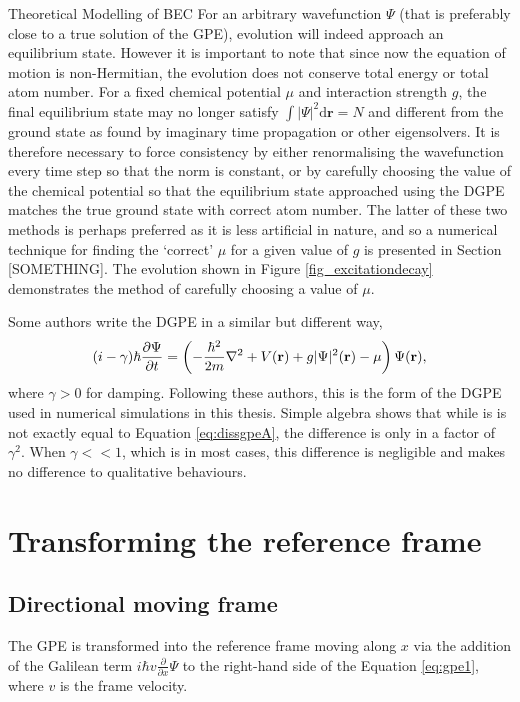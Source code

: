 \begin{chapter}{\label{cha:theoretical_model}Theoretical Modelling of BEC}
	For an arbitrary wavefunction $\Psi$ (that is preferably close to a true solution of the GPE), evolution will indeed approach an equilibrium state. However it is important to note that since now the equation of motion is non-Hermitian, the evolution does not conserve total energy or total atom number. For a fixed chemical potential $\mu$ and interaction strength $g$, the final equilibrium state may no longer satisfy $\int |\Psi|^2 \mathrm{d}\mathbf{r} = N$ and different from the ground state as found by imaginary time propagation or other eigensolvers. It is therefore necessary to force consistency by either renormalising the wavefunction every time step so that the norm is constant, or by carefully choosing the value of the chemical potential so that the equilibrium state approached using the DGPE matches the true ground state with correct atom number. The latter of these two methods is perhaps preferred as it is less artificial in nature, and so a numerical technique for finding the `correct' $\mu$ for a given value of $g$ is presented in Section [SOMETHING]. The evolution shown in Figure \ref{fig_excitationdecay} demonstrates the method of carefully choosing a value of $\mu$.

	Some authors \cite{tsubota_kasamatsu_02,madarassy_barenghi_08} write the DGPE in a similar but different way,
	\begin{equation}\label{eq:dissgpeB}
		(i-\gamma)\hbar \frac{\partial \Psi}{\partial t} = \left( -\frac{\hbar^2 }{2m}\nabla^2 + V({\bf r}) + g|\Psi|^2({\bf r}) - \mu \right) \Psi({\bf r}),
	\end{equation}
	where $\gamma > 0$ for damping. Following these authors, this is the form of the DGPE used in numerical simulations in this thesis. Simple algebra shows that while is is not exactly equal to Equation \ref{eq:dissgpeA}, the difference is only in a factor of $\gamma^2$. When $\gamma<<1$, which is in most cases, this difference is negligible and makes no difference to qualitative behaviours.

\section{\label{section:movframe} Transforming the reference frame}
	\subsection{\label{section:linearmovframe} Directional moving frame}
	The GPE is transformed into the reference frame moving along $x$ via the addition of the Galilean term $ i\hbar v\frac{\partial}{\partial x} \Psi$ to the right-hand side of the Equation \ref{eq:gpe1}, where $v$ is the frame velocity. 

\end{chapter}
